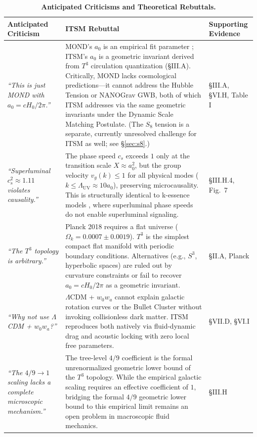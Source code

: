 \documentclass[aps,prd,10pt,twocolumn,superscriptaddress,nofootinbib,floatfix]{revtex4-2}
\begin{document}
\begin{table}[htbp]
\centering
\caption{\footnotesize \textbf{Anticipated Criticisms and Theoretical Rebuttals.}}
\label{tab:criticisms}
\renewcommand{\arraystretch}{1.15}
\scriptsize
\begin{tabular}{p{} p{} p{}}
\toprule
\textbf{Anticipated Criticism} & \textbf{ITSM Rebuttal} & \textbf{Supporting Evidence} \\
\midrule
\textit{``This is just MOND with $a_0 = c H_0 / 2\pi$.''} & MOND's $a_0$ is an empirical fit parameter \cite{mond}; ITSM's $a_0$ is a geometric invariant derived from $T^3$ circulation quantization (\S III.A). Critically, MOND lacks cosmological predictions---it cannot address the Hubble Tension or NANOGrav GWB, both of which ITSM addresses via the same geometric invariants under the Dynamic Scale Matching Postulate. (The $S_8$ tension is a separate, currently unresolved challenge for ITSM as well; see \S\ref{sec:s8}.) & \S III.A, \S VI.H, Table I \\
\textit{``Superluminal $c_s^2 \approx 1.11$ violates causality.''} & The phase speed $c_s$ exceeds $1$ only at the transition scale $X \approx a_0^2$, but the group velocity $v_g(k) \le 1$ for all physical modes ($k \le \Lambda_{\text{UV}} \approx 10a_0$), preserving microcausality. This is structurally identical to k-essence models \cite{babichev_cs2}, where superluminal phase speeds do not enable superluminal signaling. & \S III.H.4, Fig.~7 \\
\textit{``The $T^3$ topology is arbitrary.''} & Planck 2018 requires a flat universe ($\Omega_k = 0.0007 \pm 0.0019$). $T^3$ is the simplest compact flat manifold with periodic boundary conditions. Alternatives (e.g., $S^3$, hyperbolic spaces) are ruled out by curvature constraints or fail to recover $a_0 = c H_0 / 2\pi$ as a geometric invariant. & \S II.A, Planck \cite{planck} \\
\textit{``Why not use $\Lambda$CDM + $w_0 w_a$?''} & $\Lambda$CDM + $w_0 w_a$ cannot explain galactic rotation curves or the Bullet Cluster without invoking collisionless dark matter. ITSM reproduces both natively via fluid-dynamic drag and acoustic locking with zero local free parameters. & \S VII.D, \S VI.I \\
\textit{``The $4/9 \to 1$ scaling lacks a complete microscopic mechanism.''} & The tree-level $4/9$ coefficient is the formal unrenormalized geometric lower bound of the $T^3$ topology. While the empirical galactic scaling requires an effective coefficient of $1$, bridging the formal $4/9$ geometric lower bound to this empirical limit remains an open problem in macroscopic fluid mechanics. & \S III.H \\

\end{tabular}
\end{table}
\end{document}

